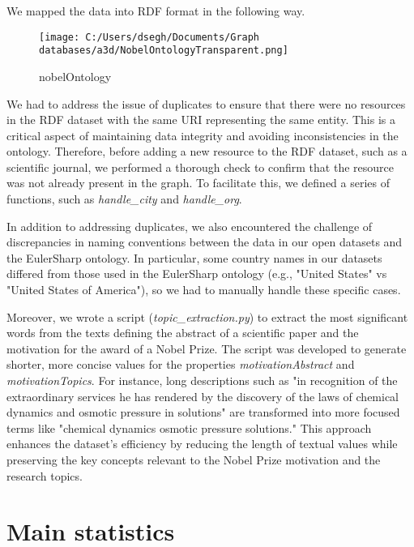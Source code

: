 \documentclass{article}
\begin{document}
\noindent We mapped the data into RDF format in the following way.

\begin{figure}[ht]
    \centering
    \texttt{[image: C:/Users/dsegh/Documents/Graph databases/a3d/NobelOntologyTransparent.png]}
    \caption{nobelOntology}
    \label{fig:nobelOntology}
\end{figure}

\newpage

\noindent We had to address the issue of duplicates to ensure that there were no resources in the RDF dataset with the same URI representing the same
entity. This is a critical aspect of maintaining data integrity and avoiding inconsistencies in the ontology. Therefore, before adding a new resource to
the RDF dataset, such as a scientific journal, we performed a thorough check to confirm that the resource was not already present in the graph.
To facilitate this, we defined a series of functions, such as \textit{handle\_city} and \textit{handle\_org}.

\noindent In addition to addressing duplicates, we also encountered the challenge of discrepancies in naming conventions between the data in our open
datasets and the EulerSharp ontology. In particular, some country names in our datasets differed from those used in the EulerSharp ontology (e.g., "United
States" vs "United States of America"), so we had to manually handle these specific cases.

\noindent Moreover, we wrote a script (\textit{topic\_extraction.py}) to extract the most significant words from the texts defining the abstract of a
scientific paper and the motivation for the award of a Nobel Prize. The script was developed to generate shorter, more concise values for the properties
\textit{motivationAbstract} and \textit{motivationTopics}. For instance, long descriptions such as "in recognition of the extraordinary services he has rendered by the
discovery of the laws of chemical dynamics and osmotic pressure in solutions" are transformed into more focused terms like "chemical dynamics osmotic
pressure solutions." This approach enhances the dataset's efficiency by reducing the length of textual values while preserving the key concepts relevant
to the Nobel Prize motivation and the research topics.

\section*{Main statistics}
\end{document}
